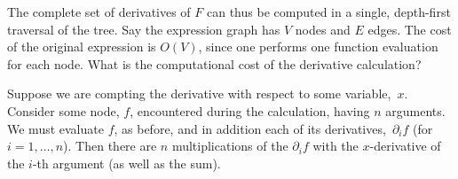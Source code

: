 \documentclass[11pt, a4paper]{article}
\begin{document}
The complete set of derivatives of $F$ can thus be computed in a
single, depth-first traversal of the tree. Say the expression graph
has $V$ nodes and $E$ edges. The cost of the original expression is
$O(V)$, since one performs one function evaluation for each node.
What is the computational cost of the derivative calculation?

Suppose we are compting the derivative with respect to some
variable,~$x$. Consider some node, $f$, encountered during the
calculation, having $n$ arguments. We must evaluate $f$, as before,
and in addition each of its derivatives,~$\partial_i f$ (for
$i=1,\dotsc,n$). Then there are $n$ multiplications of the
$\partial_i f$ with the $x$-derivative of the $i$-th argument (as well as the
sum).
\end{document}
